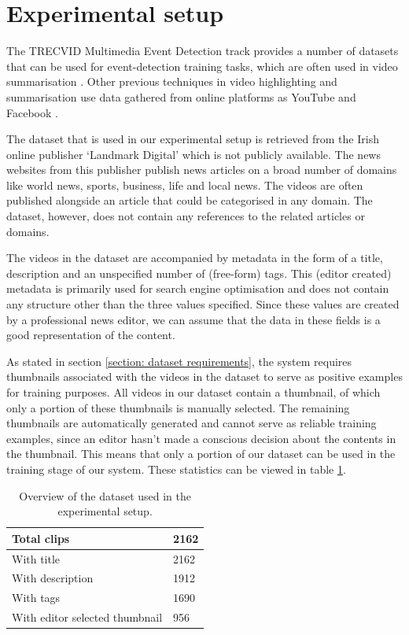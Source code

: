 \documentclass{../resources/sig-alternate-05-2015}
\begin{document}
\section{Experimental setup}
\label{experimental setup dataset}

The TRECVID Multimedia Event Detection track provides a number of datasets that can be used for event-detection training tasks, which are often used in video summarisation \cite{Ajmal:2012hi, Christel:2004in, Money:2008fn}. Other previous techniques in video highlighting and summarisation use data gathered from online platforms as YouTube and Facebook \cite{Yang:2015gi, Almeida:2012be}.

The dataset that is used in our experimental setup is retrieved from the Irish online publisher `Landmark Digital' which is not publicly available. The news websites from this publisher publish news articles on a broad number of domains like world news, sports, business, life and local news. The videos are often published alongside an article that could be categorised in any domain. The dataset, however, does not contain any references to the related articles or domains.

The videos in the dataset are accompanied by metadata in the form of a title, description and an unspecified number of (free-form) tags. This (editor created) metadata is primarily used for search engine optimisation and does not contain any structure other than the three values specified. Since these values are created by a professional news editor, we can assume that the data in these fields is a good representation of the content.

As stated in section \ref{section: dataset requirements}, the system requires thumbnails associated with the videos in the dataset to serve as positive examples for training purposes. All videos in our dataset contain a thumbnail, of which only a portion of these thumbnails is manually selected. The remaining thumbnails are automatically generated and cannot serve as reliable training examples, since an editor hasn't made a conscious decision about the contents in the thumbnail. This means that only a portion of our dataset can be used in the training stage of our system. These statistics can be viewed in table \ref{table:dataset}.

\begin{table}[h]
\caption{Overview of the dataset used in the experimental setup.}
\label{table:dataset}
\begin{tabular}{ll}
Total clips                    & 2162 \\ \hline
With title                     & 2162 \\
With description               & 1912 \\
With tags                      & 1690 \\
With editor selected thumbnail & 956 
\end{tabular}
\end{table}
\end{document}
